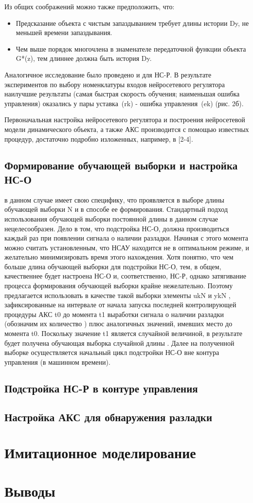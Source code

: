 Из общих соображений можно также предположить, что:
\begin{itemize}
\item Предсказание объекта с чистым запаздыванием требует длины
  истории Dy, не меньшей времени запаздывания.
\item Чем выше порядок многочлена в знаменателе передаточной функции
  объекта G*(z), тем длиннее должна быть история Dy.
\end{itemize}

Аналогичное исследование было проведено и для НС-Р. В результате
экспериментов по выбору номенклатуры входов нейросетевого регулятора
наилучшие результаты (самая быстрая скорость обучения; наименьшая
ошибка управления) оказались у пары уставка (rk) - ошибка
управления (ek) (рис. 2б).

Первоначальная настройка нейросетевого регулятора и построения
нейросетевой модели динамического объекта, а также АКС производится с
помощью известных процедур, достаточно подробно изложенных, например,
в [2-4].

\subsection{Формирование обучающей выборки и настройка НС-О}

в данном случае имеет свою специфику, что проявляется в выборе длины
обучающей выборки N и в способе ее формирования. Стандартный подход
использования обучающей выборки постоянной длины в данном случае
нецелесообразен. Дело в том, что подстройка НС-О, должна производиться
каждый раз при появлении сигнала о наличии разладки. Начиная с этого
момента можно считать установленным, что НСАУ находится не в
оптимальном режиме, и желательно минимизировать время этого
нахождения. Хотя понятно, что чем больше длина обучающей выборки для
подстройки НС-О, тем, в общем, качественнее будет настроена НС-О и,
соответственно, НС-Р, однако затягивание процесса формирования
обучающей выборки крайне нежелательно. Поэтому предлагается
использовать в качестве такой выборки элементы {uk}N и {yk}N ,
зафиксированные на интервале от начала запуска последней
контролирующей процедуры АКС t0 до момента t1 выработки сигнала о
наличии разладки (обозначим их количество ) плюс аналогичных значений,
имевших место до момента t0.  Поскольку значение t1 является случайной
величиной, в результате будет получена обучающая выборка случайной
длины . Далее на полученной выборке осуществляется начальный цикл
подстройки НС-О вне контура управления (в машинном времени).

\subsection{Подстройка НС-Р в контуре управления}
\subsection{Настройка АКС для обнаружения разладки}
\section{Имитационное моделирование}
\section{Выводы}
